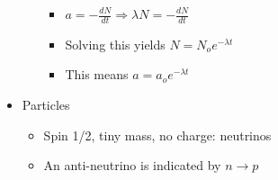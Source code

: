 \begin{itemize}
\begin{itemize}
        \begin{itemize}

          \item $a=-\frac{dN}{dt}\Rightarrow \lambda N=-\frac{dN}{dt}$

          \item Solving this yields $N=N_oe^{-\lambda t}$

          \item This means $a=a_oe^{-\lambda t}$

        \end{itemize}

    \end{itemize}

  \item Particles

    \begin{itemize}

      \item Spin 1/2, tiny mass, no charge: neutrinos

      \item An anti-neutrino is indicated by $n\rightarrow p$

    \end{itemize}

\end{itemize}



